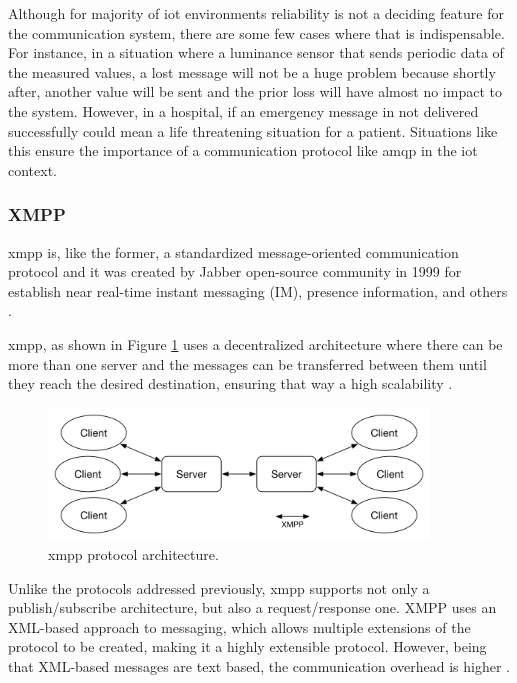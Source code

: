 Although for majority of \ac{iot} environments reliability is not a deciding feature for the communication system, there are some few cases where that is indispensable. For instance, in a situation where a luminance sensor that sends periodic data of the measured values, a lost message will not be a huge problem because shortly after, another value will be sent and the prior loss will have almost no impact to the system. However, in a hospital, if an emergency message in not delivered successfully could mean a life threatening situation for a patient. Situations like this ensure the importance of a communication protocol like \ac{amqp} in the \ac{iot} context.

\subsubsection{XMPP}

\acf{xmpp} is, like the former, a standardized message-oriented communication protocol and it was created by Jabber open-source community in 1999 for establish near real-time instant messaging (IM), presence information, and others \cite{Badugu}.

\ac{xmpp}, as shown in Figure \ref{fig:xmpp} uses a decentralized architecture where there can be more than one server and the messages can be transferred between them until they reach the desired destination, ensuring that way a high scalability \cite{Al-fuqaha2015}.

\begin{figure}[H]
	\centering
	\includegraphics[width=0.9\textwidth]{figures/xmpp.png}
	\caption{\ac{xmpp} protocol architecture.}
	\label{fig:xmpp}
\end{figure}

Unlike the protocols addressed previously, \ac{xmpp} supports not only a publish/subscribe architecture, but also a request/response one. XMPP uses an XML-based approach to messaging, which allows multiple extensions of the protocol to be created, making it a highly extensible protocol. However, being that XML-based messages are text based, the communication overhead is higher \cite{Salman2013}. 

